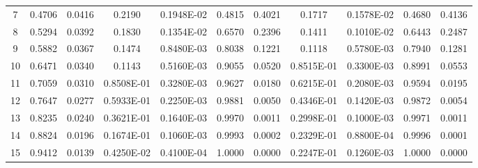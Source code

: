 \documentclass[
twocolumn,
aps,prd,
nofootinbib,
superscriptaddress,
showpacs,ligh
tightenlines, 
]{revtex4}
\begin{document}
\begin{widetext}
\begin{table}[h]
\begin{center}
\begin{tabular}{|c|c|c|c|c|c|c|c|c|c|c|}
     7                 &        0.4706             &        0.0416             &     0.2190                 &     0.1948E-02             &        0.4815             &        0.4021             & 0.1717 & 0.1578E-02 & 0.4680 & 0.4136 \\
      8                 &        0.5294             &        0.0392             &     0.1830                 &     0.1354E-02             &        0.6570             &        0.2396             & 0.1411 & 0.1010E-02 & 0.6443 & 0.2487 \\
      9                 &        0.5882             &        0.0367             &     0.1474                 &     0.8480E-03             &        0.8038             &        0.1221             & 0.1118 & 0.5780E-03 & 0.7940 & 0.1281 \\
      10                 &        0.6471             &        0.0340             &     0.1143                 &     0.5160E-03             &        0.9055             &        0.0520             & 0.8515E-01 & 0.3300E-03 & 0.8991 & 0.0553 \\
      11                 &        0.7059             &        0.0310             &     0.8508E-01             &     0.3280E-03             &        0.9627             &        0.0180             & 0.6215E-01 & 0.2080E-03 & 0.9594 & 0.0195 \\
      12                 &        0.7647             &        0.0277             &     0.5933E-01             &     0.2250E-03             &        0.9881             &        0.0050             & 0.4346E-01 & 0.1420E-03 & 0.9872 & 0.0054 \\
      13                 &        0.8235             &        0.0240             &     0.3621E-01             &     0.1640E-03             &        0.9970             &        0.0011             & 0.2998E-01 & 0.1000E-03 & 0.9971 & 0.0011 \\
      14                 &        0.8824             &        0.0196             &     0.1674E-01             &     0.1060E-03             &        0.9993             &        0.0002             & 0.2329E-01 & 0.8800E-04 & 0.9996 & 0.0001 \\
      15                 &        0.9412             &        0.0139             &     0.4250E-02             &     0.4100E-04             &        1.0000             &        0.0000             & 0.2247E-01 & 0.1260E-03 & 1.0000 & 0.0000 \\




\end{tabular}
\end{center}
\end{table}
\end{widetext}
\end{document}
